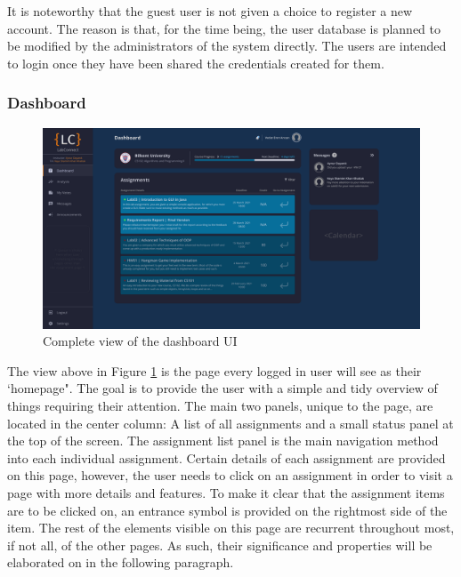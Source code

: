 \documentclass[a4paper, 12pt]{article}
\begin{document}
    It is noteworthy that the guest user is not given a choice to register a new account.
    The reason is that, for the time being, the user database is planned to be modified by the administrators of the system directly.
    The users are intended to login once they have been shared the credentials created for them.
    
    \pagebreak
    
    \subsubsection{Dashboard}
    
    \begin{figure}[H]
        \centering
        \includegraphics[width=\textwidth]{main_dashboard}
        \caption{Complete view of the dashboard UI}
        \label{fig:dashboard_full}
    \end{figure}
    
    The view above in Figure \ref{fig:dashboard_full} is the page every logged in user will see as their `homepage".
    The goal is to provide the user with a simple and tidy overview of things requiring their attention.
    The main two panels, unique to the page, are located in the center column: A list of all assignments and a small
    status panel at the top of the screen. The assignment list panel is the main navigation method into each individual
    assignment. Certain details of each assignment are provided on this page, however, the user needs to click on an
    assignment in order to visit a page with more details and features. To make it clear that the assignment items are
    to be clicked on, an entrance symbol is provided on the rightmost side of the item.
    The rest of the elements visible on this page are recurrent throughout most, if not all, of the other pages.
    As such, their significance and properties will be elaborated on in the following paragraph.
    
\end{document}
